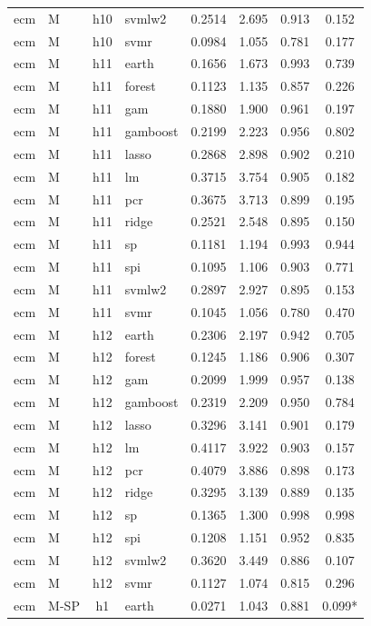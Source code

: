 \begin{ThreePartTable}
\begin{longtable}[t]{llclcccc}
ecm & M & h10 & svmlw2 & 0.2514 & 2.695 & 0.913 & 0.152\\
ecm & M & h10 & svmr & 0.0984 & 1.055 & 0.781 & 0.177\\
\addlinespace
ecm & M & h11 & earth & 0.1656 & 1.673 & 0.993 & 0.739\\
ecm & M & h11 & forest & 0.1123 & 1.135 & 0.857 & 0.226\\
ecm & M & h11 & gam & 0.1880 & 1.900 & 0.961 & 0.197\\
ecm & M & h11 & gamboost & 0.2199 & 2.223 & 0.956 & 0.802\\
ecm & M & h11 & lasso & 0.2868 & 2.898 & 0.902 & 0.210\\
ecm & M & h11 & lm & 0.3715 & 3.754 & 0.905 & 0.182\\
ecm & M & h11 & pcr & 0.3675 & 3.713 & 0.899 & 0.195\\
ecm & M & h11 & ridge & 0.2521 & 2.548 & 0.895 & 0.150\\
ecm & M & h11 & sp & 0.1181 & 1.194 & 0.993 & 0.944\\
ecm & M & h11 & spi & 0.1095 & 1.106 & 0.903 & 0.771\\
ecm & M & h11 & svmlw2 & 0.2897 & 2.927 & 0.895 & 0.153\\
ecm & M & h11 & svmr & 0.1045 & 1.056 & 0.780 & 0.470\\
\addlinespace
ecm & M & h12 & earth & 0.2306 & 2.197 & 0.942 & 0.705\\
ecm & M & h12 & forest & 0.1245 & 1.186 & 0.906 & 0.307\\
ecm & M & h12 & gam & 0.2099 & 1.999 & 0.957 & 0.138\\
ecm & M & h12 & gamboost & 0.2319 & 2.209 & 0.950 & 0.784\\
ecm & M & h12 & lasso & 0.3296 & 3.141 & 0.901 & 0.179\\
ecm & M & h12 & lm & 0.4117 & 3.922 & 0.903 & 0.157\\
ecm & M & h12 & pcr & 0.4079 & 3.886 & 0.898 & 0.173\\
ecm & M & h12 & ridge & 0.3295 & 3.139 & 0.889 & 0.135\\
ecm & M & h12 & sp & 0.1365 & 1.300 & 0.998 & 0.998\\
ecm & M & h12 & spi & 0.1208 & 1.151 & 0.952 & 0.835\\
ecm & M & h12 & svmlw2 & 0.3620 & 3.449 & 0.886 & 0.107\\
ecm & M & h12 & svmr & 0.1127 & 1.074 & 0.815 & 0.296\\
\addlinespace
ecm & M-SP & h1 & earth & 0.0271 & 1.043 & 0.881 & 0.099*\\

\end{longtable}
\end{ThreePartTable}
